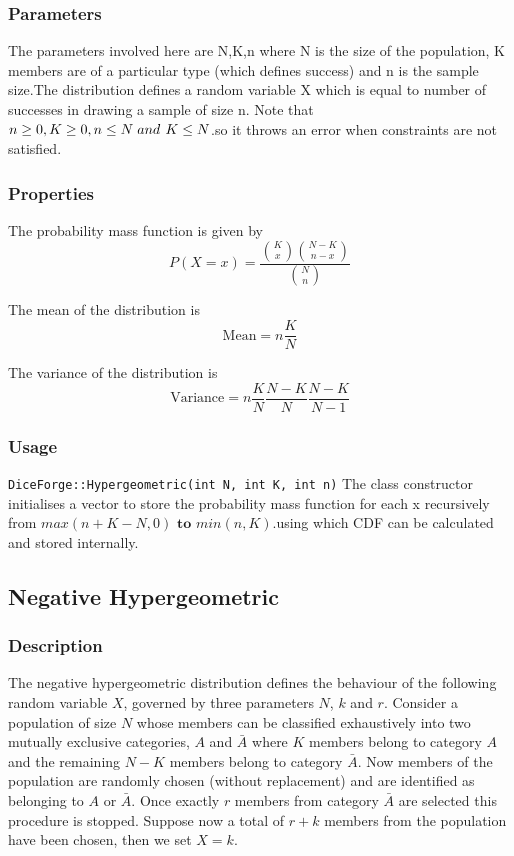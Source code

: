 \documentclass[titlepage, 11pt]{article}
\newcommand{\code}[1]
{\colorbox{light-gray}{\texttt{#1}}}
\begin{document}
\subsubsection{Parameters}
The parameters involved here are N,K,n where N is the size of the population, K members are of a particular type (which defines success) and n is the sample size.The distribution defines a random variable X which is equal to number of successes in drawing a sample of size n.
Note that $n\geq0, K\geq0 ,n\leq N \hspace{0.1cm}and \textbf{ }K\leq N$.so it throws an error when constraints are not satisfied.
\subsubsection{Properties}
The probability mass function is given by 
\[
P(X = x) = \frac{\binom{K}{x} \binom{N - K}{n - x}}{\binom{N}{n}}
\]

The mean of the distribution is 
$$\text{Mean}=n\frac{K}{N}$$

The variance of the distribution is 
$$\text{Variance}=n\frac{K}{N}\frac{N-K}{N}\frac{N-K}{N-1}$$


\subsubsection{Usage}
\code{DiceForge::Hypergeometric(int N, int K, int n)}\newline
The class constructor initialises  a vector to store the probability mass function for each x recursively from $max(n+K-N,0)\textbf{ to }min(n,K)$.using which CDF can be calculated and stored internally.
\newline

\subsection{Negative Hypergeometric}

\subsubsection{Description}

The negative hypergeometric distribution defines the behaviour of the following random variable $X$, governed by three parameters $N$, $k$ and $r$.
\newline
Consider a population of size $N$ whose members can be classified exhaustively into two mutually exclusive categories, $A$ and $\bar{A}$ where $K$ members belong to category $A$ and the remaining $N - K$ members belong to category $\bar{A}$. Now members of the population are randomly chosen (without replacement) and are identified as belonging to $A$ or $\bar{A}$. Once exactly $r$ members from category $\bar{A}$ are selected this procedure is stopped. Suppose now a total of $r + k$ members from the population have been chosen, then we set $X = k$.
\end{document}
